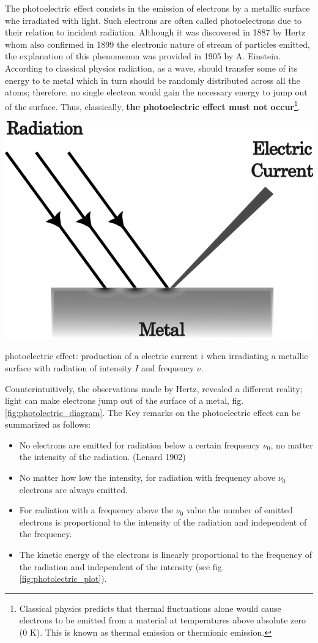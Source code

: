 \documentclass{article}
\begin{document}
The photoelectric effect consists in the emission of electrons by a metallic surface whe irradiated with light. Such electrons are often called photoelectrons due to their relation to incident radiation. Although it was discovered in 1887 by Hertz whom also confirmed in 1899 the electronic nature of stream of particles emitted, the explanation of this phenomenon was provided in 1905 by A. Einstein. According to classical physics radiation, as a wave, should transfer some of its energy to te metal which in turn should be randomly distributed across all the atoms; therefore, no single electron would gain the necessary energy to jump out of the surface. Thus, classically, \textbf{the photoelectric effect must not occur}\footnote{Classical physics predicts that thermal 
fluctuations alone would cause electrons to be emitted from a material at 
temperatures above absolute zero (0 K). This is known as thermal emission or 
thermionic emission.}.
\begin{marginfigure}%
  \includegraphics[width=\linewidth]{figures/photoelectric_effect.pdf}
  \caption{photoelectric effect: production of a electric current $i$ when irradiating a metallic surface with radiation of intensity $I$ and frequency $\nu$.}
  \label{fig:photolectric_diagram}
\end{marginfigure}
Counterintuitively, the observations made by Hertz, revealed a different reality; light can make electrons jump out of the surface of a metal, fig. \ref{fig:photolectric_diagram}. The Key remarks on the photoelectric effect can be summarized as follows:
\begin{itemize}
  \item No electrons are emitted for radiation below a certain frequency $\nu_0$, no matter the intensity of the radiation. (Lenard 1902)
  \item No matter how low the intensity, for radiation with frequency above $\nu_0$ electrons are always emitted.
  \item For radiation with a frequency above the $\nu_0$ value the number of emitted electrons is proportional to the intensity of the radiation and independent of the frequency.
  \item The kinetic energy of the electrons is linearly proportional to the frequency of the radiation and independent of the intensity (see fig. \ref{fig:photolectric_plot}).
\end{itemize}
\end{document}
